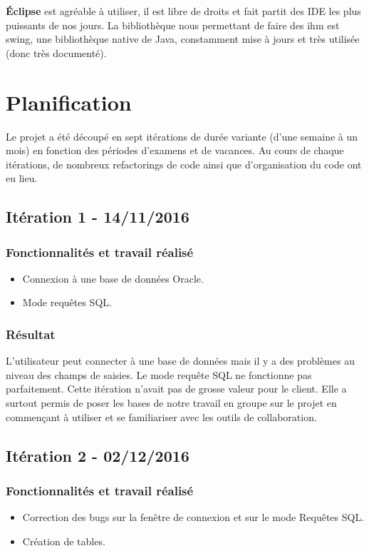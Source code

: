 \textbf{Éclipse} est agréable à utiliser, il est libre de droits et fait partit des IDE les plus puissants de nos jours.
La bibliothèque nous permettant de faire des \gls{ihm} est swing, une bibliothèque native de Java, constamment mise à jours et très utilisée (donc très documenté).

\section{Planification}
Le projet a été découpé en sept itérations de durée variante (d'une semaine à un mois) en fonction des périodes d'examens et de vacances. Au cours de chaque itérations, de nombreux refactorings de code ainsi que d'organisation du code ont eu lieu.


\subsection{Itération 1 - 14/11/2016}

\subsubsection{Fonctionnalités et travail réalisé}
\begin{itemize}
\item Connexion à une base de données Oracle.
\item Mode requêtes SQL.
\end{itemize}

\subsubsection{Résultat}
L'utilisateur peut connecter à une base de données mais il y a des problèmes au niveau des champs de saisies. Le mode requête SQL ne fonctionne pas parfaitement.
Cette itération n'avait pas de grosse valeur pour le client. Elle a surtout permis de poser les bases de notre travail en groupe sur le projet en commençant à utiliser et se familiariser avec les outils de collaboration.


\subsection{Itération 2 - 02/12/2016}
\subsubsection{Fonctionnalités et travail réalisé}
\begin{itemize}
\item Correction des bugs sur la fenêtre de connexion et sur le mode Requêtes SQL.
\item Création de tables.
\end{itemize}

